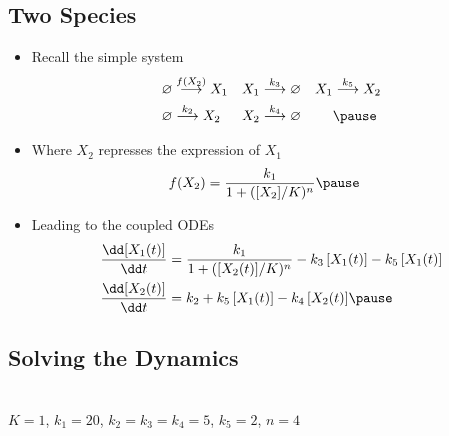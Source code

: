 \begin{slide}
\section[-2]{Two Species}

\begin{PauseHighLight}
  \begin{itemize}
  \item Recall the simple system
    \begin{align*}
      \varnothing &\goesto{f(X_2)} X_1 &
      X_1 &\goesto{k_3} \varnothing & X_1 &\goesto{k_5} X_2 \\
      \varnothing &\goesto{k_2} X_2 & X_2 &\goesto{k_4} \varnothing &&\pause
    \end{align*}
  \item Where $X_2$ represses the expression of $X_1$
    {\small \begin{align*}
      f(X_2) &= \frac{k_1}{1+([X_2]/K)^n}\pause
    \end{align*}}
  \item Leading to the coupled ODEs
    {\small \begin{align*}
      \frac{\dd [X_1(t)]}{\dd t} &= \frac{k_1}{1+([X_2(t)]/K)^n} - k_3 \,
                                 [X_1(t)]- k_5\,[X_1(t)] \\
       \frac{\dd [X_2(t)]}{\dd t} &= k_2 + k_5\,[X_1(t)] - k_4\,[X_2(t)]\pause
    \end{align*}}
  \end{itemize}
\end{PauseHighLight}

\end{slide}


\begin{slide}
\section[-2]{Solving the Dynamics}
\pause
\pb {}
\begin{center}
  \pause\\
  $K=1$, $k_1=20$, $k_2=k_3=k_4=5$, $k_5=2$, $n=4$\pauseh 
\end{center}
\end{slide}


